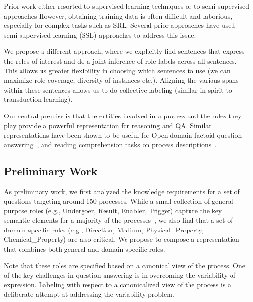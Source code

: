 Prior work either resorted to supervised learning techniques or to semi-supervised approaches 
However, obtaining training data is often difficult and laborious, especially for complex tasks such as SRL.
Several prior approaches have used semi-supervised learning (SSL) approaches to address this issue. 

We propose a different approach, where we explicitly find sentences that express the roles of interest and do a joint inference of role labels across all sentences. 
This allows us greater flexibility in choosing which sentences to use (we can maximize role coverage, diversity of instances etc.).
Aligning the various spans within these sentences allows us to do collective labeling (similar in spirit to transduction learning).


Our central premise is that the entities involved in a process and the roles they play provide a powerful representation for reasoning and QA. 
Similar representations have been shown to be useful for Open-domain factoid question answering~\cite{shen2007using,pizzato2008indexing}, 
and reading comprehension tasks on process descriptions~\cite{berantSrikumar14}.


\subsection{Preliminary Work}

As preliminary work, we first analyzed the knowledge requirements for a set of questions targeting around 150 processes. 
While a small collection of general purpose roles (e.g., Undergoer, Result, Enabler, Trigger) capture the key semantic elements for a 
majority of the processes~\cite{louvan2015:kcap}, we also find that a set of domain specific roles (e.g., Direction, Medium, Physical\_Property, Chemical\_Property) are also critical. We propose to compose a representation that combines both general and domain specific roles. 

Note that these roles are specified based on a canonical view of the process. One of the key challenges in question answering is in overcoming the variability of expression. Labeling with respect to a canonicalized view of the process is a deliberate attempt at addressing the variability problem. 

